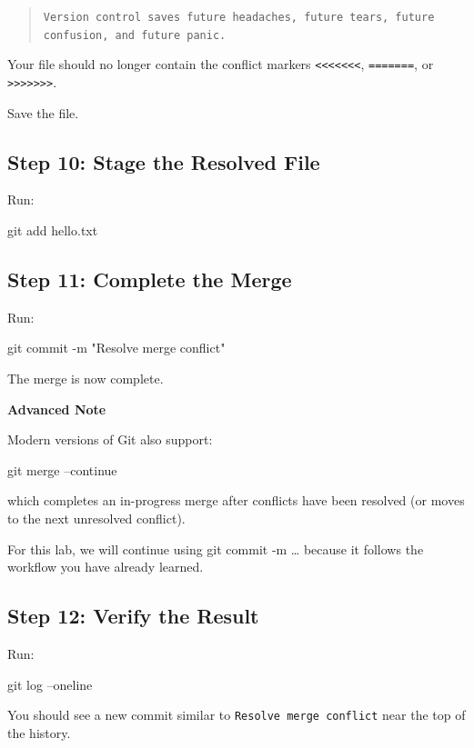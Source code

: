 \documentclass{csc2059practical}
\begin{document}
\begin{quote}
\texttt{Version control saves future headaches, future tears, future confusion, and future panic.}
\end{quote}
Your file should no longer contain the conflict markers \texttt{<<<<<<<}, \texttt{=======}, or \texttt{>>>>>>>}.

Save the file.

\subsection{Step 10: Stage the Resolved File}
Run:

\begin{terminalplain}
git add hello.txt
\end{terminalplain}
\subsection{Step 11: Complete the Merge}
Run:

\begin{terminalplain}
git commit -m "Resolve merge conflict"
\end{terminalplain}
The merge is now complete.
\begin{importantnote}
  
  \textbf{Advanced Note}\par
  \medskip
  Modern versions of Git also support:
  
  \begin{terminalplain}
    git merge --continue
  \end{terminalplain}
  which completes an in-progress merge after conflicts have been resolved (or moves to the next unresolved conflict).
  
  For this lab, we will continue using git commit -m \ldots{} because it follows the workflow you have already learned.
\end{importantnote}
  
\subsection{Step 12: Verify the Result}
Run:

\begin{terminalplain}
git log --oneline
\end{terminalplain}
You should see a new commit similar to \texttt{Resolve merge conflict} near the top of the history.
\end{document}

